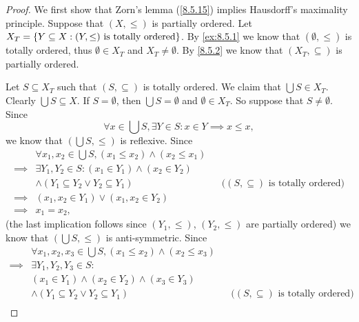 \begin{proof}
  We first show that Zorn's lemma (\cref{8.5.15}) implies Hausdorff's maximality principle.
  Suppose that \((X, \leq)\) is partially ordered.
  Let \(X_T = \left\lbrace Y \subseteq X : (Y, \leq) \text{ is totally ordered}\right\rbrace\).
  By \cref{ex:8.5.1} we know that \((\emptyset, \leq)\) is totally ordered, thus \(\emptyset \in X_T\) and \(X_T \neq \emptyset\).
  By \cref{8.5.2} we know that \((X_T, \subseteq)\) is partially ordered.

  Let \(S \subseteq X_T\) such that \((S, \subseteq)\) is totally ordered.
  We claim that \(\bigcup S \in X_T\).
  Clearly \(\bigcup S \subseteq X\).
  If \(S = \emptyset\), then \(\bigcup S = \emptyset\) and \(\emptyset \in X_T\).
  So suppose that \(S \neq \emptyset\).
  Since
  \[
    \forall x \in \bigcup S, \exists Y \in S : x \in Y \implies x \leq x,
  \]
  we know that \((\bigcup S, \leq)\) is reflexive.
  Since
  \begin{align*}
             & \forall x_1, x_2 \in \bigcup S, (x_1 \leq x_2) \land (x_2 \leq x_1)                                                     \\
    \implies & \exists Y_1, Y_2 \in S : (x_1 \in Y_1) \land (x_2 \in Y_2)                                                              \\
             & \land (Y_1 \subseteq Y_2 \lor Y_2 \subseteq Y_1)                    &  & \text{(\((S, \subseteq)\) is totally ordered)} \\
    \implies & (x_1, x_2 \in Y_1) \lor (x_1, x_2 \in Y_2)                                                                              \\
    \implies & x_1 = x_2,
  \end{align*}
  (the last implication follows since \((Y_1, \leq)\), \((Y_2, \leq)\) are partially ordered)
  we know that \((\bigcup S, \leq)\) is anti-symmetric.
  Since
  \begin{align*}
             & \forall x_1, x_2, x_3 \in \bigcup S, (x_1 \leq x_2) \land (x_2 \leq x_3)                                                              \\
    \implies & \exists Y_1, Y_2, Y_3 \in S :                                                                                                         \\
             & (x_1 \in Y_1) \land (x_2 \in Y_2) \land (x_3 \in Y_3)                                                                                 \\
             & \land (Y_1 \subseteq Y_2 \lor Y_2 \subseteq Y_1)                                  &  & \text{(\((S, \subseteq)\) is totally ordered)} \\

\end{align*}
\end{proof}
